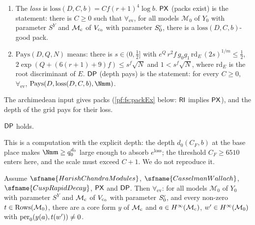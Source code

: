 \begin{definition}
\begin{enumerate}[label=(\alph*)]
\begin{enumerate}[label=(\roman*)]
\[\]
\item a Lipschitz bound with constant $e^Q|c|$ for the integral of
$|\mathrm{coef}(v,v)(\iota_0(\exp(sX)h))-\mathrm{coef}(v,v)(\iota_0h)|$.
\end{enumerate}
\item The \emph{loss} is $\mathrm{loss}(D,C,b)=Cf(r+1)^4\log b$. $\mathsf{PX}$ (packs exist) is the statement: there is $C\ge0$ such
that $\forall_{\mathrm{ev}}$, for all models $\mathcal M_0$ of $Y_0$ with parameter $S^Y$ and $\mathcal M_{\mathrm{c}}$ of $V_{\mathrm{c}_0}$ with
parameter $S^{\mathrm{c}}_0$, there is a $\mathrm{loss}(D,C,b)$-good pack.
\item $\mathrm{Pays}(D,Q,N)$ means: there is $s\in(0,\frac12]$ with
$e^Q\,r^2f\,g_0g_1\,\mathrm{rd}_E\,(2s)^{1/m}\le\frac12$, $2\exp(Q+(6(r+1)+9)f)\le s^f\sqrt N$ and $1<s^f\sqrt N$, where $\mathrm{rd}_E$ is
the root discriminant of $E$. $\mathsf{DP}$ (depth pays) is the statement: for every $C\ge0$, $\forall_{\mathrm{ev}}$,
$\mathrm{Pays}(D,\mathrm{loss}(D,C,b),\Nm\fsm)$.
\end{enumerate}
\end{definition}

The archimedean input gives packs (\cref{pf:fs:packEx} below: $\mathsf{RI}$ implies $\mathsf{PX}$), and the depth of the grid pays for their loss.

\begin{proposition}\label{pf:fs:packdepth}
$\mathsf{DP}$ holds.
\end{proposition}

This is a computation with the explicit depth: the depth $d_0(C_F,b)$ at the base place makes $\Nm\fsm\ge q_0^{d_0}$ large enough to absorb
$e^{\mathrm{loss}}$; the threshold $C_F\ge6510$ enters here, and the scale must exceed $C+1$. We do not reproduce it.

\begin{theorem}\label{pf:fs:cuspPer}
Assume $\sfname{HarishChandraModules}$, $\sfname{CasselmanWallach}$, $\sfname{CuspRapidDecay}$, $\mathsf{PX}$ and $\mathsf{DP}$. Then
$\forall_{\mathrm{ev}}$: for all models $\mathcal M_0$ of $Y_0$ with parameter $S^Y$ and $\mathcal M_{\mathrm{c}}$ of $V_{\mathrm{c}_0}$ with
parameter $S^{\mathrm{c}}_0$, and every non-zero $t\in\mathrm{Rows}(\mathcal M_0)$, there are a core form $y$ of $\mathcal M_{\mathrm{c}}$ and
$a\in H^{\infty}(\mathcal M_{\mathrm{c}})$, $w'\in H^{\infty}(\mathcal M_0)$ with $\mathrm{per}_0(y(a),t(w'))\ne0$.
\end{theorem}

